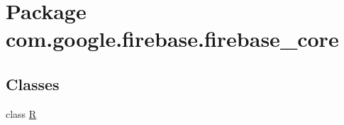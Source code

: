 \hypertarget{namespacecom_1_1google_1_1firebase_1_1firebase__core}{}\section{Package com.\+google.\+firebase.\+firebase\+\_\+core}
\label{namespacecom_1_1google_1_1firebase_1_1firebase__core}
\subsection*{Classes}
\begin{DoxyCompactItemize}
\item 
class \mbox{\hyperlink{classcom_1_1google_1_1firebase_1_1firebase__core_1_1R}{R}}
\end{DoxyCompactItemize}
